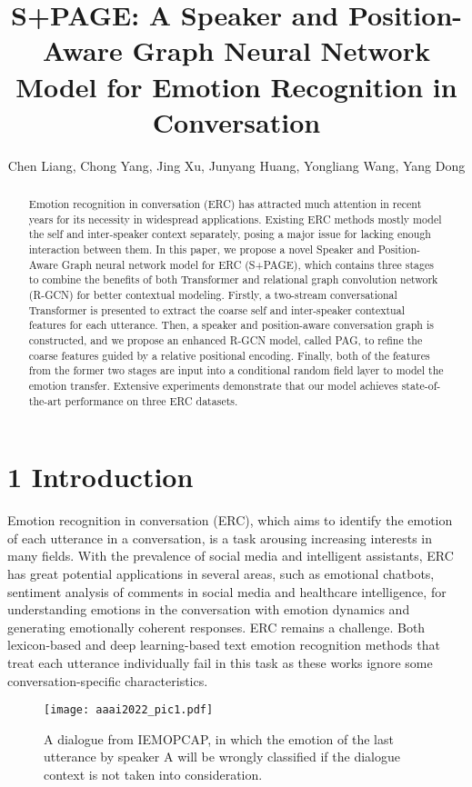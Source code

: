 \documentclass[letterpaper]{article} \usepackage{aaai22}  \usepackage{times}  \usepackage{helvet}  \usepackage{courier}  \usepackage[hyphens]{url}  \usepackage{graphicx} \urlstyle{rm} \def\UrlFont{\rm}  \usepackage{natbib}  \usepackage{caption} \DeclareCaptionStyle{ruled}{labelfont=normalfont,labelsep=colon,strut=off} \frenchspacing  \setlength{\pdfpagewidth}{8.5in}  \setlength{\pdfpageheight}{11in}  \usepackage{algorithm}
\title{S+PAGE: A Speaker and Position-Aware Graph Neural Network Model for Emotion Recognition in Conversation}
\author{
Chen Liang, Chong Yang, Jing Xu, Junyang Huang, Yongliang Wang, Yang Dong
}
\begin{document}
\maketitle

\begin{abstract}


Emotion recognition in conversation (ERC) has attracted much attention in recent years for its necessity in widespread applications. Existing ERC methods mostly model the self and inter-speaker context separately, posing a major issue for lacking enough interaction between them. In this paper, we propose a novel Speaker and Position-Aware Graph neural network model for ERC (S+PAGE), which contains three stages to combine the benefits of both Transformer and relational graph convolution network (R-GCN) for better contextual modeling. Firstly, a two-stream conversational Transformer is presented to extract the coarse self and inter-speaker contextual features for each utterance. Then, a speaker and position-aware conversation graph is constructed, and we propose an enhanced R-GCN model, called PAG, to refine the coarse features guided by a relative positional encoding. Finally, both of the features from the former two stages are input into a conditional random field layer to model the emotion transfer. 
Extensive experiments demonstrate that our model achieves  state-of-the-art performance on three ERC datasets.
\end{abstract}


\section{1 Introduction}
Emotion recognition in conversation (ERC), which aims to identify the emotion of each utterance in a conversation, is a task arousing increasing interests in many fields. With the prevalence of social media and intelligent assistants, ERC has great potential applications in several areas, such as emotional chatbots, sentiment analysis of comments in social media and healthcare intelligence, for understanding emotions in the conversation with emotion dynamics and generating emotionally coherent responses. ERC remains a challenge. Both lexicon-based \cite{wu2006emotion,shaheen2014emotion} and deep learning-based \cite{colnerivc2018emotion} text emotion recognition methods that treat each utterance individually fail in this task as these works ignore some conversation-specific characteristics.

\begin{figure}[t]
\centering
\texttt{[image: aaai2022\_pic1.pdf]} \caption{A dialogue from IEMOPCAP, in which the emotion of the last utterance by speaker A will be wrongly classified if the dialogue context is not taken into consideration.}
\label{fig1}
\end{figure}
\end{document}
